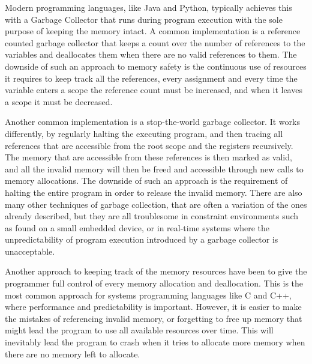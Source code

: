 Modern programming languages, like Java and Python, typically achieves this with a Garbage Collector that runs during program execution with the sole purpose of keeping the memory intact.
A common implementation is a reference counted garbage collector that keeps a count over the number of references to the variables and deallocates them when there are no valid references to them.
The downside of such an approach to memory safety is the continuous use of resources it requires to keep track all the references, every assignment and every time the variable enters a scope the reference count must be increased, and when it leaves a scope it must be decreased.

Another common implementation is a stop-the-world garbage collector.
It works differently, by regularly halting the executing program, and then tracing all references that are accessible from the root scope and the registers recursively.
The memory that are accessible from these references is then marked as valid, and all the invalid memory will then be freed and accessible through new calls to memory allocations.
The downside of such an approach is the requirement of halting the entire program in order to release the invalid memory.
There are also many other techniques of garbage collection, that are often a variation of the ones already described, but they are all troublesome in constraint environments such as found on a small embedded device, or in real-time systems where the unpredictability of program execution introduced by a garbage collector is unacceptable.

Another approach to keeping track of the memory resources have been to give the programmer full control of every memory allocation and deallocation.
This is the most common approach for systems programming languages like C and C++, where performance and predictability is important.
However, it is easier to make the mistakes of referencing invalid memory, or forgetting to free up memory that might lead the program to use all available resources over time.
This will inevitably lead the program to crash when it tries to allocate more memory when there are no memory left to allocate.



